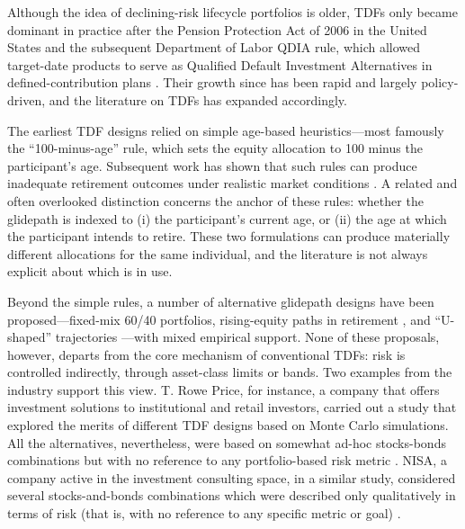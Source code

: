 \documentclass[11pt]{article}
\begin{document}
Although the idea of declining-risk lifecycle portfolios is older, 
TDFs only became dominant in practice after the Pension Protection 
Act of 2006 in the United States and the subsequent Department of 
Labor QDIA rule, which allowed target-date products to serve as 
Qualified Default Investment Alternatives in defined-contribution 
plans \cite{martin2007,dol2007}. Their growth since has been rapid and largely policy-driven, 
and the literature on TDFs has expanded accordingly.

The earliest TDF designs relied on simple age-based heuristics---most famously the ``100-minus-age'' rule, which sets the equity allocation to 100 minus the participant's age. Subsequent work has shown that such rules can produce inadequate retirement outcomes under realistic market conditions \cite{shiller2005}. A related and often overlooked distinction concerns the anchor of these rules: whether the glidepath is indexed to (i) the participant's current age, or (ii) the age at which the participant intends to retire. These two formulations can produce materially different allocations for the same individual, and the literature is not always explicit about which is in use.

Beyond the simple rules, a number of alternative glidepath designs have been proposed---fixed-mix 60/40 portfolios, rising-equity paths in retirement \cite{pfau2013}, and ``U-shaped'' trajectories \cite{estrada2019a,estrada2019b}---with mixed empirical support. None of these proposals, however, departs from the core mechanism of conventional TDFs: risk is controlled indirectly, through asset-class limits or bands.  Two examples from the industry support this view. T. Rowe Price, for instance, a company that offers investment solutions to institutional and retail investors, carried out a study that explored the merits of different TDF designs based on Monte Carlo simulations.  All the alternatives, nevertheless, were based on somewhat ad-hoc stocks-bonds combinations but with no reference to any portfolio-based risk metric \cite{trowe2016}. NISA, a company active in the investment consulting space, in a similar study, considered several stocks-and-bonds combinations which were described only qualitatively in terms of risk (that is, with no reference to any specific metric or goal) \cite{nisa2016}. 
\end{document}
